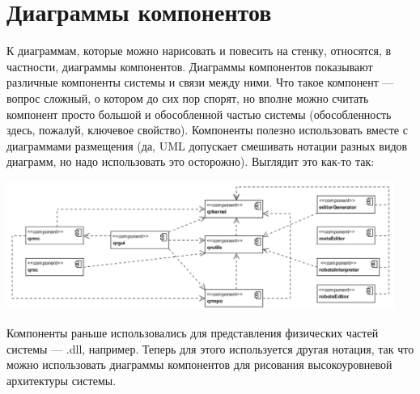 \documentclass[a5paper]{article}
\begin{document}
\section{Диаграммы компонентов}

К диаграммам, которые можно нарисовать и повесить на стенку, относятся, в частности, диаграммы компонентов. Диаграммы компонентов показывают различные компоненты системы и связи между ними. Что такое компонент --- вопрос сложный, о котором до сих пор спорят, но вполне можно считать компонент просто большой и обособленной частью системы (обособленность здесь, пожалуй, ключевое свойство). Компоненты полезно использовать вместе с диаграммами размещения (да, UML допускает смешивать нотации разных видов диаграмм, но надо использовать это осторожно). Выглядит это как-то так:

\begin{center}
	\includegraphics[width=0.95\textwidth]{componentDiagram.png}
\end{center}

Компоненты раньше использовались для представления физических частей системы --- .dll, например. Теперь для этого используется другая нотация, так что можно использовать диаграммы компонентов для рисования высокоуровневой архитектуры системы.
\end{document}
